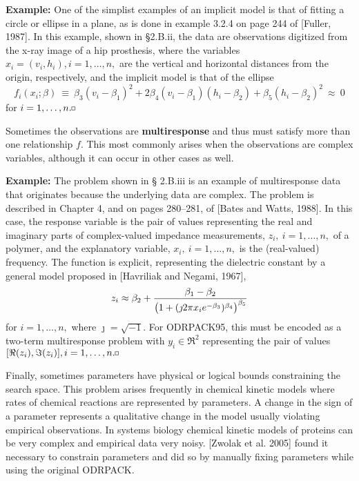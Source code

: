 \h{\bf Example:} One of the simplist examples of an implicit model is that of fitting a circle or ellipse in a plane, as is done in example 3.2.4 on page 244 of [Fuller, 1987]. In this example, shown in \S 2.B.ii, the data are observations digitized from the x-ray image of a hip prosthesis, where the variables $x_{i}=(v_{i},h_{i}), i=1,\ldots, n,$ are the vertical and horizontal distances from the origin, respectively, and the implicit model is that of the ellipse
$$f_{i}(x_{i};\beta)\ \equiv\ \beta_{3}(v_{i}-\beta_{1})^{2}+2\beta_{4}(v_{i}-\beta_{1})(h_{i}-\beta_{2})+\beta_{5}(h_{i}-\beta_{2})^{2}\ \approx\ 0$$
for $i=1,\ldots, n.\hfill\square$

\noindent Sometimes the observations are {\bf multiresponse} and thus must satisfy more than one relationship $f$. This most commonly arises when the observations are complex variables, although it can occur in other cases as well.

\h{\bf Example:} The problem shown in \S
2.B.iii is an example of multiresponse data that originates because the underlying data are complex. The problem is described in Chapter 4, and on pages 280--281, of [Bates and Watts, 1988]. In this case, the response variable is the pair of values representing the real and imaginary parts of complex-valued impedance measurements, $z_{i},\ i=1,\ldots, n,$ of a polymer, and the explanatory variable, $x_{i},\ i=1,\ldots, n,$ is the (real-valued) frequency. The function is explicit, representing the dielectric constant by a general model proposed in [Havriliak and Negami, 1967],
$$z_{i}\approx\beta_{2}+{{\beta_{1}-\beta_{2}}\over{\bigl(1+(\jmath2\pi x_{i}e^{-\beta_{3}})^{\beta_{4}}\bigr)^{\beta_{5}}}}$$
for $i=1,\ldots, n,$ where $\jmath=\sqrt{-1}$. For ODRPACK95, this must be encoded as a two-term multiresponse problem with $y_{i}\in\Re^{2}$ representing the pair of values $[\Re(z_{i}),\Im(z_{i})],
i=1,\ldots, n.\hfill\square$

\noindent Finally, sometimes parameters have physical or logical bounds
constraining the search space.  This problem arises frequently in chemical
kinetic models where rates of chemical reactions are represented by
parameters.  A change in the sign of a parameter represents a qualitative
change in the model usually violating empirical observations.  In systems
biology chemical kinetic models of proteins can be very complex and
empirical data very noisy.  [Zwolak et al. 2005] found it necessary to
constrain parameters and did so by manually fixing parameters while using
the original ODRPACK.

